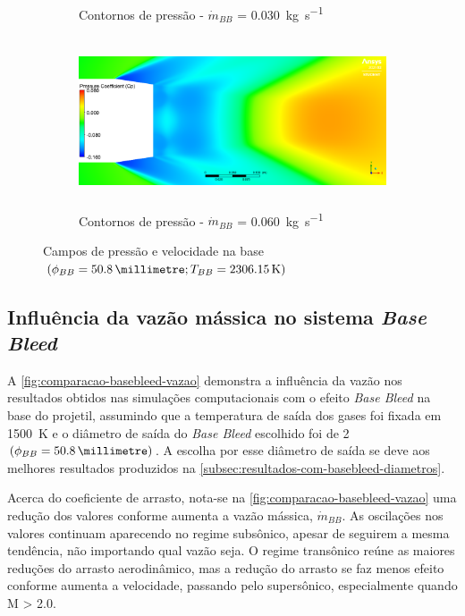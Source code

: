 \begin{figure}
\begin{subfigure}[b]{0.47\textwidth}
        \caption{Contornos de pressão - \(\Dot{m}_{BB}\) = \qty{0,030}{\kilogram\per\second}}
        \label{fig:contorno-pressao-base-bb-2pol-vazao0030}
    \end{subfigure}
    \hfill
    \begin{subfigure}[b]{0.47\textwidth} %
        \centering
        \includegraphics[height=5cm,width=\textwidth]{coeficientepressao-vazao0060-temp2306-diam2pol.png}
        \caption{Contornos de pressão - \(\Dot{m}_{BB}\) = \qty{0,060}{\kilogram\per\second}}
        \label{fig:contorno-pressao-base-bb-2pol-vazao0030}
    \end{subfigure}
	\caption{Campos de pressão e velocidade na base \(\left(\phi_{BB} = \qty{50,8}{\millimetre}; T_{BB} = \qty{2306,15}{\kelvin}\right)\)}
	\label{fig:influencia-base-diametro-vazao-2pol}
\end{figure}

\subsection{Influência da vazão mássica no sistema \textit{Base Bleed}} \label{subsec:resultados-com-basebleed-vazao}

A \autoref{fig:comparacao-basebleed-vazao} demonstra a influência da vazão nos resultados obtidos nas simulações computacionais com o efeito \textit{Base Bleed} na base do projetil, assumindo que a temperatura de saída dos gases foi fixada em \qty{1500}{\kelvin} e o diâmetro de saída do \textit{Base Bleed} escolhido foi de \qty{2}{\polegada} \(\left(\phi_{BB} = \qty{50,8}{\millimetre}\right)\). A escolha por esse diâmetro de saída se deve aos melhores resultados produzidos na \autoref{subsec:resultados-com-basebleed-diametros}.

Acerca do coeficiente de arrasto, nota-se na \autoref{fig:comparacao-basebleed-vazao} uma redução dos valores conforme aumenta a vazão mássica, \(\Dot{m}_{BB}\). As oscilações nos valores continuam aparecendo no regime subsônico, apesar de seguirem a mesma tendência, não importando qual vazão seja. O regime transônico reúne as maiores reduções do arrasto aerodinâmico, mas a redução do arrasto se faz menos efeito conforme aumenta a velocidade, passando pelo supersônico, especialmente quando M > \num{2,0}.


